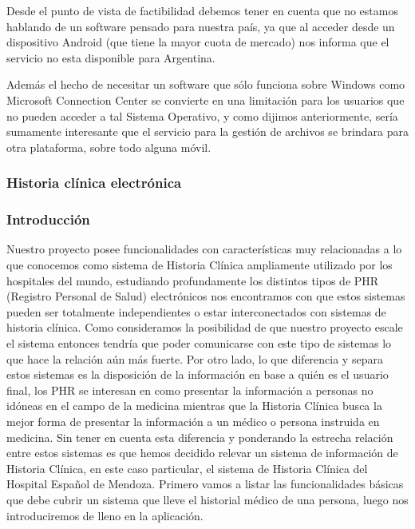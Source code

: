 \begin{itemize}
	Desde el punto de vista de factibilidad debemos tener en cuenta que no estamos hablando de un software pensado para nuestra país, ya que al acceder desde un dispositivo Android (que tiene la mayor cuota de mercado)  nos informa que el servicio no esta disponible para Argentina. 
	
	Además el hecho de necesitar un software que sólo funciona sobre Windows como Microsoft Connection Center se convierte en una limitación para los usuarios que no pueden acceder a tal Sistema Operativo, y como dijimos anteriormente, sería sumamente interesante que el servicio para la gestión de archivos se brindara para otra plataforma, sobre todo alguna móvil.
\end{itemize}



\clearpage
\subsubsection{Historia clínica electrónica}


\subsubsection{Introducción}
Nuestro proyecto posee funcionalidades con características muy relacionadas a lo que conocemos como sistema de Historia Clínica ampliamente utilizado por los hospitales del mundo, estudiando profundamente los distintos tipos de PHR (Registro Personal de Salud) electrónicos nos encontramos con que estos sistemas pueden ser totalmente independientes o estar interconectados con sistemas de historia clínica. Como consideramos la posibilidad de que nuestro proyecto escale el sistema entonces tendría que poder comunicarse con este tipo de sistemas lo que hace la relación aún más fuerte. Por otro lado, lo que diferencia y separa estos sistemas es la disposición de la información en base a quién es el usuario final, los PHR se interesan en como presentar la información a personas no idóneas en el campo de la medicina mientras que la Historia Clínica busca la mejor forma de presentar la información a un médico o persona instruida en medicina. Sin tener en cuenta esta diferencia y ponderando la estrecha relación entre estos sistemas es que hemos decidido relevar un sistema de información de Historia Clínica, en este caso particular, el sistema de Historia Clínica del Hospital Español de Mendoza.
Primero vamos a listar las funcionalidades básicas que debe cubrir un sistema que lleve el historial médico de una persona, luego nos introduciremos de lleno en la aplicación.


